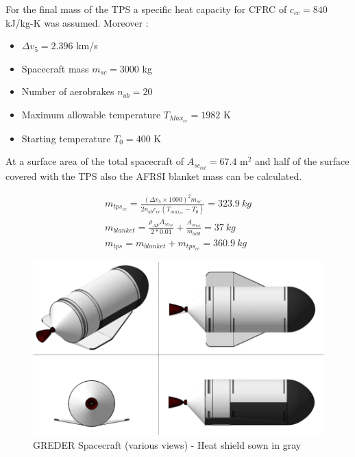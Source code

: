 \qquad For the final mass of the TPS a specific heat capacity for CFRC of $c_{cc} = 840$ kJ/kg-K was assumed. Moreover :

\begin{itemize}
	\item $\Delta v_5=2.396$ km/s
	\item Spacecraft mass $m_{sc}=3000$ kg
	\item Number of aerobrakes $n_{ab}=20$
	\item Maximum allowable temperature $T_{Max_{cc}} = 1982$ K
	\item Starting temperature $T_0=400$ K
\end{itemize}
At a surface area of the total spacecraft of $A_{sc_{tot}} = 67.4$ m$^2$ and half of the
surface covered with the TPS also the AFRSI blanket mass can be calculated.

\begin{align}
	m_{tps_{cc}} = \frac{(\Delta v_5\times 1000)^2m_{sc}}{2n_{ab}c_{cc}(T_{max_{cc}} - T_0)} = 323.9\ kg\\
	m_{blanket}=\frac{\rho_{AF}A_{sc_{tot}}}{2*0.01} + \frac{A_{sc_{tot}}}{m_{add}} = 37\ kg\\
	m_{tps} = m_{blanket} + m_{tps_{cc}} = 360.9\ kg
\end{align}
\begin{figure}[H]
	\centering\includegraphics[width=\linewidth]{grederviews}
	\caption{GREDER Spacecraft (various views) - Heat shield sown in gray}
\end{figure}